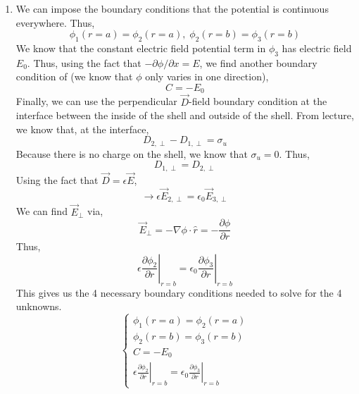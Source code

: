 \documentclass[12pt]{article}
\begin{document}
\begin{enumerate}
\begin{enumerate}
\begin{enumerate}
			\item [b.]
			We can impose the boundary conditions that the potential is continuous everywhere.
			Thus,
			\[\phi_1(r=a)=\phi_2(r=a), \; \phi_2(r=b)=\phi_3(r=b)\]
			We know that the constant electric field potential term in $\phi_3$ has electric field $E_0$.
			Thus, using the fact that $-\partial \phi/\partial x = E$, we find another boundary condition of (we know that $\phi$ only varies in one direction), 
			\[C=-E_0\]
			Finally, we can use the perpendicular $\vec D$-field boundary condition at the interface between the inside of the shell and outside of the shell.
			From lecture, we know that, at the interface,
			\[D_{2,\perp}-D_{1,\perp} = \sigma_u\]
			Because there is no charge on the shell, we know that $\sigma_u=0$.
			Thus,
			\[D_{1,\perp}=D_{2,\perp}\]
			Using the fact that $\vec D = \epsilon \vec E$,
			\[\to \epsilon \vec E_{2,\perp} = \epsilon_0 \vec E_{3,\perp}\]
			We can find $\vec E_{\perp}$ via,
			\[\vec E_{\perp}=-\nabla \phi \cdot \hat r=-\frac{\partial \phi}{\partial r}\]
			Thus,
			\[\epsilon \left.\frac{\partial \phi_2}{\partial r}\right|_{r=b}=\epsilon_0 \left.\frac{\partial \phi_3}{\partial r}\right|_{r=b}\]
			This gives us the 4 necessary boundary conditions needed to solve for the 4 unknowns.
			\[\boxed{\begin{cases}
				\phi_1(r=a)=\phi_2(r=a) \\ 
				\phi_2(r=b)=\phi_3(r=b) \\ 
				C=-E_0 \\ 
				\epsilon \left.\frac{\partial \phi_2}{\partial r}\right|_{r=b}=\epsilon_0 \left.\frac{\partial \phi_3}{\partial r}\right|_{r=b}
			\end{cases}}\]


\end{enumerate}
\end{enumerate}
\end{enumerate}
\end{document}
